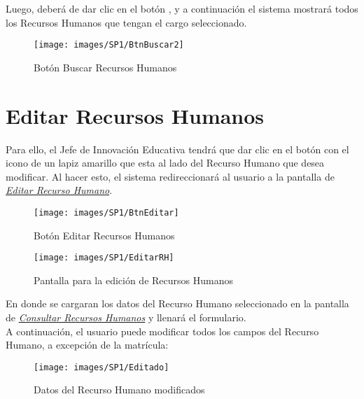         	Luego, deberá de dar clic en el botón , y a continuación el sistema mostrará todos los Recursos Humanos que tengan el cargo seleccionado.

        	\begin{figure}[!hbtp]
        		\centering
        		\hypertarget{buscar}{\texttt{[image: images/SP1/BtnBuscar2]}}
        		\caption{Botón Buscar Recursos Humanos}
        		\label{buscar}
        	\end{figure}

	    \section{Editar Recursos Humanos}

        	Para ello, el Jefe de Innovación Educativa tendrá que dar clic en el botón con el icono de un lapiz amarillo que esta al lado del Recurso Humano que desea modificar. Al hacer esto, el sistema redireccionará al usuario a la pantalla de \hyperlink{editarrh}{\textit{Editar Recurso Humano}}.

        	\begin{figure}[!hbtp]
        		\centering
        		\hypertarget{editar}{\texttt{[image: images/SP1/BtnEditar]}}
        		\caption{Botón Editar Recursos Humanos}
        		\label{editar}
        	\end{figure}

            \begin{figure}[!hbtp]
                \centering
            	\hypertarget{editarrh}{\texttt{[image: images/SP1/EditarRH]}}
            	\caption{Pantalla para la edición de Recursos Humanos}
            	\label{editarrh}
            \end{figure}

            En donde se cargaran los datos del Recurso Humano seleccionado en la pantalla de \hyperlink{consultarrh}{\textit{Consultar Recursos Humanos}} y llenará el formulario.\\

            A continuación, el usuario puede modificar todos los campos del Recurso Humano, a excepción de la matrícula:
            \begin{figure}[!hbtp]
            	\centering
            	\hypertarget{modif}{\texttt{[image: images/SP1/Editado]}}
            	\caption{Datos del Recurso Humano modificados}
            	\label{modif}
            \end{figure}

